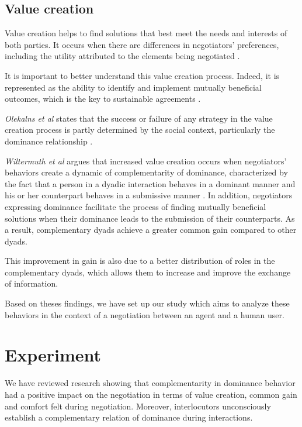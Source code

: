 \documentclass{llncs}
\begin{document}
	\subsection{Value creation}
	
	Value creation helps to find solutions that best meet the needs and interests of both parties. It occurs when there are differences in negotiators' preferences, including the utility attributed to the elements being negotiated \cite{lax1986managerial}. 
	
	It is important to better understand this value creation process. Indeed, it is represented as the ability to identify and implement mutually beneficial outcomes, which is the key to sustainable agreements \cite{wiltermuth2015benefits}.
	
	\emph{Olekalns et al} states that the success or failure of any strategy in the value creation process is partly determined by the social context, particularly the dominance relationship \cite{olekalns2013dyadic}.
	
	\emph{Wiltermuth et al} argues that increased value creation occurs when negotiators' behaviors create a dynamic of complementarity of dominance, characterized by the fact that a person in a dyadic interaction behaves in a dominant manner and his or her counterpart behaves in a submissive manner \cite{wiltermuth2015benefits}. In addition, negotiators expressing dominance facilitate the process of finding mutually beneficial solutions when their dominance leads to the submission of their counterparts. As a result, complementary dyads achieve a greater common gain compared to other dyads.
	
	This improvement in gain is also due to a better distribution of roles in the complementary dyads, which allows them to increase and improve the exchange of information. 
	
	Based on theses findings, we have set up our study which aims to analyze these behaviors in the context of a negotiation between an agent and a human user.
	
	
	\section{Experiment}
	
	We have reviewed research \cite{tiedens2003power,dryer1997opposites,wiltermuth2015benefits} showing that complementarity in dominance behavior had a positive impact on the negotiation in terms of value creation, common gain and comfort felt during negotiation. Moreover, interlocutors unconsciously establish a complementary relation of dominance during interactions.
	
\end{document}
